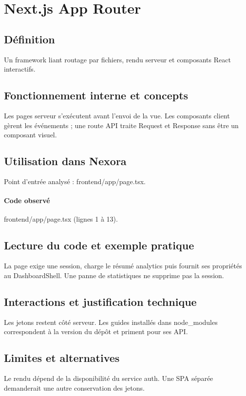 \section{Next.js App Router}
\subsection*{Définition}
Un framework liant routage par fichiers, rendu serveur et composants React interactifs.

\subsection*{Fonctionnement interne et concepts}
Les pages serveur s’exécutent avant l’envoi de la vue. Les composants client gèrent les événements ; une route API traite Request et Response sans être un composant visuel.

\subsection*{Utilisation dans Nexora}
Point d’entrée analysé : frontend/app/page.tsx.

\paragraph{Code observé} frontend/app/page.tsx (lignes 1 à 13).

\subsection*{Lecture du code et exemple pratique}
La page exige une session, charge le résumé analytics puis fournit ses propriétés au DashboardShell. Une panne de statistiques ne supprime pas la session.

\subsection*{Interactions et justification technique}
Les jetons restent côté serveur. Les guides installés dans node\_modules correspondent à la version du dépôt et priment pour ses API.

\subsection*{Limites et alternatives}
Le rendu dépend de la disponibilité du service auth. Une SPA séparée demanderait une autre conservation des jetons.

